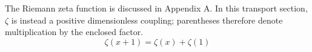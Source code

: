\documentclass{article}
\begin{document}
The Riemann zeta function is discussed in Appendix A.  In this transport
section, $\zeta$ is instead a positive dimensionless coupling; parentheses
therefore denote multiplication by the enclosed factor.
\begin{equation}
  \zeta(x+1)=\zeta(x)+\zeta(1)
\end{equation}
\end{document}

